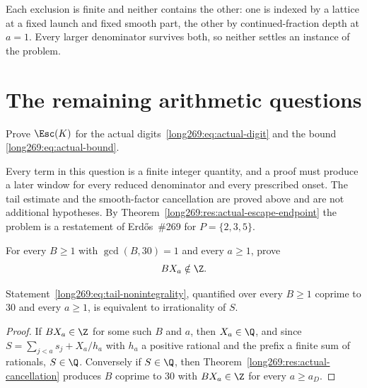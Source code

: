 Each exclusion is finite and neither contains the other: one is indexed by a
lattice at a fixed launch and fixed smooth part, the other by continued-fraction
depth at $a=1$.  Every larger denominator survives both, so neither settles an
instance of the problem.

\section{The remaining arithmetic questions}\label{long269:sec:open}

\begin{problem}\label{long269:prob:producer}
Prove $\Esc(K)$ for the actual digits~\eqref{long269:eq:actual-digit} and the bound
\eqref{long269:eq:actual-bound}.
\end{problem}

Every term in this question is a finite integer quantity, and a proof must
produce a later window for every reduced denominator and every prescribed
onset.  The tail estimate and the smooth-factor cancellation are proved above
and are not additional hypotheses.  By
Theorem~\ref{long269:res:actual-escape-endpoint} the problem is a restatement of
Erd\H{o}s~\#269 for $P=\{2,3,5\}$.

\begin{problem}\label{long269:prob:tails269}
For every $B\ge1$ with $\gcd(B,30)=1$ and every $a\ge1$, prove
\begin{equation}\label{long269:eq:tail-nonintegrality}
 BX_a\notin\Z .
\end{equation}
\end{problem}

\begin{proposition}
\label{long269:res:tails-equivalence}
Statement~\eqref{long269:eq:tail-nonintegrality}, quantified over every $B\ge1$
coprime to $30$ and every $a\ge1$, is equivalent to irrationality of $S$.
\end{proposition}

\begin{proof}
If $BX_a\in\Z$ for some such $B$ and $a$, then $X_a\in\Q$, and since
$S=\sum_{j<a}s_j+X_a/h_a$ with $h_a$ a positive rational and the prefix a
finite sum of rationals, $S\in\Q$.  Conversely if $S\in\Q$, then
Theorem~\ref{long269:res:actual-cancellation} produces $B$ coprime to $30$ with
$BX_a\in\Z$ for every $a\ge a_D$.
\end{proof}

